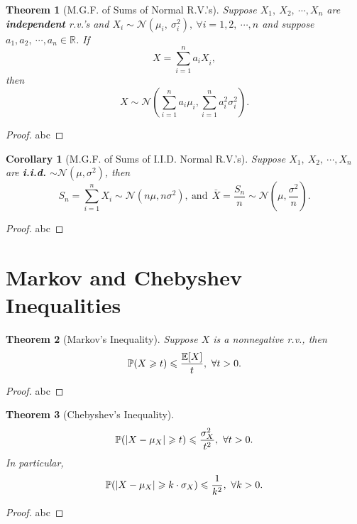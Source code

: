 \documentclass[openany,12pt]{book}
\newtheorem{theorem}{Theorem}[chapter]
\newtheorem{corollary}{Corollary}[chapter]
\begin{document}
\begin{theorem}[M.G.F. of Sums of Normal R.V.'s]
Suppose $X_{1},\ X_{2},\ \cdots,X_{n}$ are \textbf{independent} r.v.'s
and $X_{i}\sim \mathcal{N}\left( \mu_{i},\ \sigma_{i}^{2} \right),\ \forall i = 1,2,\ \cdots,n$
and suppose $a_{1},a_{2},\ \cdots,a_n\in\mathbb{R}$.
If 
\[ X = \sum_{i = 1}^{n}{a_{i}X}_{i},\]
then
\[ X\sim \mathcal{N}\left( \sum_{i = 1}^{n}{a_{i}\mu_{i}},\sum_{i = 1}^{n}{a_{i}^{2}\sigma_{i}^{2}} \right).\]
\end{theorem}

\begin{proof}
  abc
\end{proof}

\begin{corollary}[M.G.F. of Sums of I.I.D. Normal R.V.'s]
Suppose $X_{1},\ X_{2},\ \cdots,X_{n}$ are \textbf{i.i.d.} 
$\sim \mathcal{N}\left( \mu,\sigma^{2} \right)$, then
\[S_{n} = \sum_{i = 1}^{n}X_{i}\sim \mathcal{N}\left( n\mu,n\sigma^{2} \right),\ \mathrm{\text{and}}\mathrm{\ }\ \bar{X} = \frac{S_{n}}{n}\sim \mathcal{N}\left( \mu,\frac{\sigma^{2}}{n} \right).\]
\end{corollary}

\begin{proof}
  abc
\end{proof}

\section{Markov and Chebyshev Inequalities}

\begin{theorem}[Markov's Inequality]
Suppose $X$ is a nonnegative r.v., then
\[\mathbb{P}(X \geqslant t) \leqslant \frac{\mathbb{E}[X]}{t},\ \forall t > 0.\]
\end{theorem}

\begin{proof}
  abc
\end{proof}

\begin{theorem}[Chebyshev's Inequality]
\[\mathbb{P}( \left| X - \mu_{X} \right| \geqslant t ) \leqslant \frac{\sigma_{X}^{2}}{t^{2}},\ \forall t > 0.\]
In particular,
\[\mathbb{P}(\left| X - \mu_{X} \right| \geqslant k \cdot \sigma_{X}) \leqslant \frac{1}{k^{2}},\ \forall k > 0.\]
\end{theorem}

\begin{proof}
  abc
\end{proof}
\end{document}
